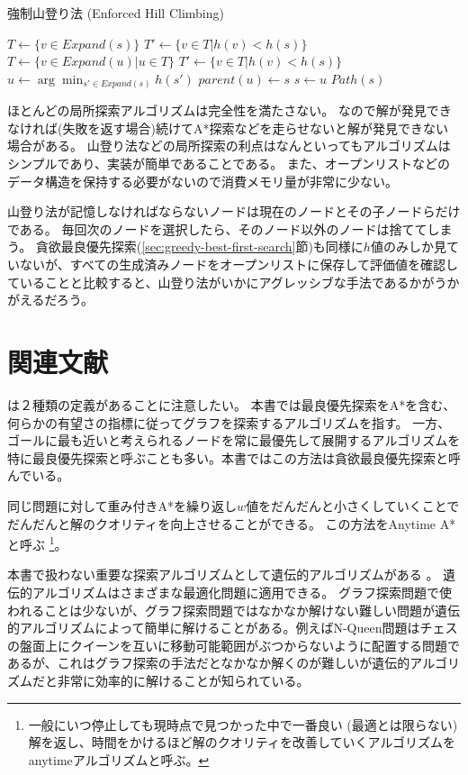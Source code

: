 \begin{algorithm}
\caption{強制山登り法 (Enforced Hill Climbing)}
	 {
	  $T \leftarrow \{v \in Expand(s)\}$\;
	  $T' \leftarrow \{v \in T | h(v) < h(s) \}$\;
           {
            $T \leftarrow \{v \in Expand(u) | u \in T\}$\;
 	    $T' \leftarrow \{v \in T | h(v) < h(s) \}$\;
          }
	  $u \leftarrow \arg \min_{s' \in Expand(s)} h(s')$\;
          $parent(u) \leftarrow s$\;
          $s \leftarrow u$\;
	}
	\Return $Path(s)$
\label{alg:hill-climbing}
\end{algorithm}


ほとんどの局所探索アルゴリズムは完全性を満たさない。
なので解が発見できなければ(失敗を返す場合)続けてA*探索などを走らせないと解が発見できない場合がある。
山登り法などの局所探索の利点はなんといってもアルゴリズムはシンプルであり、実装が簡単であることである。
また、オープンリストなどのデータ構造を保持する必要がないので消費メモリ量が非常に少ない。

山登り法が記憶しなければならないノードは現在のノードとその子ノードらだけである。
毎回次のノードを選択したら、そのノード以外のノードは捨ててしまう。
貪欲最良優先探索(\ref{sec:greedy-best-first-search}節)も同様に$h$値のみしか見ていないが、すべての生成済みノードをオープンリストに保存して評価値を確認していることと比較すると、山登り法がいかにアグレッシブな手法であるかがうかがえるだろう。



\section{関連文献}

は２種類の定義があることに注意したい。
本書では最良優先探索をA*を含む、何らかの有望さの指標に従ってグラフを探索するアルゴリズムを指す。
一方、ゴールに最も近いと考えられるノードを常に最優先して展開するアルゴリズムを特に最良優先探索と呼ぶことも多い。本書ではこの方法は貪欲最良優先探索と呼んでいる。

同じ問題に対して重み付きA*を繰り返し$w$値をだんだんと小さくしていくことでだんだんと解のクオリティを向上させることができる。
この方法をAnytime A*と呼ぶ \cite{likhachev2004ara} \footnote{一般にいつ停止しても現時点で見つかった中で一番良い (最適とは限らない)解を返し、時間をかけるほど解のクオリティを改善していくアルゴリズムをanytimeアルゴリズムと呼ぶ。}。

本書で扱わない重要な探索アルゴリズムとして遺伝的アルゴリズムがある \cite{goldberg1989}。
遺伝的アルゴリズムはさまざまな最適化問題に適用できる。
グラフ探索問題で使われることは少ないが、グラフ探索問題ではなかなか解けない難しい問題が遺伝的アルゴリズムによって簡単に解けることがある。例えばN-Queen問題はチェスの盤面上にクイーンを互いに移動可能範囲がぶつからないように配置する問題であるが、これはグラフ探索の手法だとなかなか解くのが難しいが遺伝的アルゴリズムだと非常に効率的に解けることが知られている。
